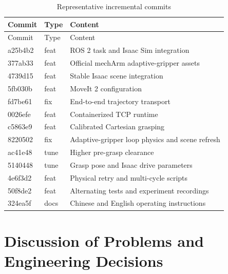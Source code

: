 \documentclass[UTF8,zihao=-4,scheme=chinese,fontset=none]{ctexart}
\begin{document}
\begin{longtable}{p{2.0cm}p{4.0cm}p{7.0cm}}
\caption{Representative incremental commits}\\\toprule Commit & Type & Content\\\midrule\endfirsthead
\toprule Commit & Type & Content\\\midrule\endhead
a25b4b2 & feat & ROS 2 task and Isaac Sim integration\\
377ab33 & feat & Official mechArm adaptive-gripper assets\\
4739d15 & feat & Stable Isaac scene integration\\
5fb030b & feat & MoveIt 2 configuration\\
fd7be61 & fix & End-to-end trajectory transport\\
0026efe & feat & Containerized TCP runtime\\
c5863e9 & feat & Calibrated Cartesian grasping\\
8220502 & fix & Adaptive-gripper loop physics and scene refresh\\
ac41e48 & tune & Higher pre-grasp clearance\\
5140448 & tune & Grasp pose and Isaac drive parameters\\
4e6f3d2 & feat & Physical retry and multi-cycle scripts\\
50f8de2 & feat & Alternating tests and experiment recordings\\
324ea5f & docs & Chinese and English operating instructions\\
\bottomrule
\end{longtable}

\section{Discussion of Problems and Engineering Decisions}
\end{document}
